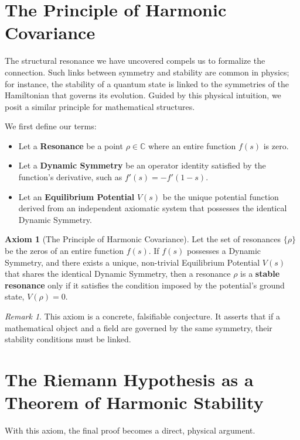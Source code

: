 \documentclass{article}
\theoremstyle{plain}
\theoremstyle{definition}
\newtheorem{axiom}[theorem]{Axiom}
\theoremstyle{remark}
\newtheorem*{remark}{Remark}
\begin{document}
\section{The Principle of Harmonic Covariance}
\label{sec:covariance}
The structural resonance we have uncovered compels us to formalize the connection. Such links between symmetry and stability are common in physics; for instance, the stability of a quantum state is linked to the symmetries of the Hamiltonian that governs its evolution. Guided by this physical intuition, we posit a similar principle for mathematical structures.

We first define our terms:
\begin{itemize}
    \item Let a \textbf{Resonance} be a point $\rho \in \mathbb{C}$ where an entire function $f(s)$ is zero.
    \item Let a \textbf{Dynamic Symmetry} be an operator identity satisfied by the function's derivative, such as $f'(s) = -f'(1-s)$.
    \item Let an \textbf{Equilibrium Potential} $V(s)$ be the unique potential function derived from an independent axiomatic system that possesses the identical Dynamic Symmetry.
\end{itemize}

\begin{axiom}[The Principle of Harmonic Covariance]
\label{ax:covariance}
Let the set of resonances $\{\rho\}$ be the zeros of an entire function $f(s)$. If $f(s)$ possesses a Dynamic Symmetry, and there exists a unique, non-trivial Equilibrium Potential $V(s)$ that shares the identical Dynamic Symmetry, then a resonance $\rho$ is a \textbf{stable resonance} only if it satisfies the condition imposed by the potential's ground state, $V(\rho)=0$.
\end{axiom}

\begin{remark}
This axiom is a concrete, falsifiable conjecture. It asserts that if a mathematical object and a field are governed by the same symmetry, their stability conditions must be linked.
\end{remark}

\section{The Riemann Hypothesis as a Theorem of Harmonic Stability}
\label{sec:proof}
With this axiom, the final proof becomes a direct, physical argument.
\end{document}
